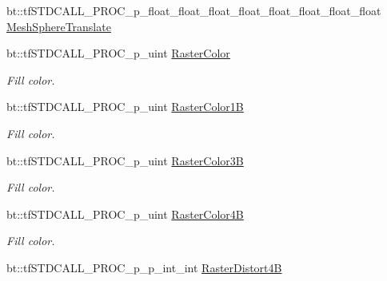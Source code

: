 \begin{DoxyCompactItemize}
\item 
bt\-::tf\-S\-T\-D\-C\-A\-L\-L\-\_\-\-P\-R\-O\-C\-\_\-p\-\_\-float\-\_\-float\-\_\-float\-\_\-float\-\_\-float\-\_\-float\-\_\-float\-\_\-float \hyperlink{structs_functions_gen_a464d544e89a44aaeb9a37f405cb2d516}{Mesh\-Sphere\-Translate}
\item 
\hypertarget{structs_functions_gen_a839cea3a87eb41a580ff3ec9674a6984}{bt\-::tf\-S\-T\-D\-C\-A\-L\-L\-\_\-\-P\-R\-O\-C\-\_\-p\-\_\-uint \hyperlink{structs_functions_gen_a839cea3a87eb41a580ff3ec9674a6984}{Raster\-Color}}\label{structs_functions_gen_a839cea3a87eb41a580ff3ec9674a6984}

\begin{DoxyCompactList}\small\item\em Fill color. \end{DoxyCompactList}\item 
\hypertarget{structs_functions_gen_a5878ffa0b6acbb1fed31276c06c26398}{bt\-::tf\-S\-T\-D\-C\-A\-L\-L\-\_\-\-P\-R\-O\-C\-\_\-p\-\_\-uint \hyperlink{structs_functions_gen_a5878ffa0b6acbb1fed31276c06c26398}{Raster\-Color1\-B}}\label{structs_functions_gen_a5878ffa0b6acbb1fed31276c06c26398}

\begin{DoxyCompactList}\small\item\em Fill color. \end{DoxyCompactList}\item 
\hypertarget{structs_functions_gen_a88464b13e441b87d81396adf4b3a4e31}{bt\-::tf\-S\-T\-D\-C\-A\-L\-L\-\_\-\-P\-R\-O\-C\-\_\-p\-\_\-uint \hyperlink{structs_functions_gen_a88464b13e441b87d81396adf4b3a4e31}{Raster\-Color3\-B}}\label{structs_functions_gen_a88464b13e441b87d81396adf4b3a4e31}

\begin{DoxyCompactList}\small\item\em Fill color. \end{DoxyCompactList}\item 
\hypertarget{structs_functions_gen_af4c91215f954f362ca148762be1191ad}{bt\-::tf\-S\-T\-D\-C\-A\-L\-L\-\_\-\-P\-R\-O\-C\-\_\-p\-\_\-uint \hyperlink{structs_functions_gen_af4c91215f954f362ca148762be1191ad}{Raster\-Color4\-B}}\label{structs_functions_gen_af4c91215f954f362ca148762be1191ad}

\begin{DoxyCompactList}\small\item\em Fill color. \end{DoxyCompactList}\item 
\hypertarget{structs_functions_gen_ae3230acb8b24378d2bbc23419fc0a9b9}{bt\-::tf\-S\-T\-D\-C\-A\-L\-L\-\_\-\-P\-R\-O\-C\-\_\-p\-\_\-p\-\_\-int\-\_\-int \hyperlink{structs_functions_gen_ae3230acb8b24378d2bbc23419fc0a9b9}{Raster\-Distort4\-B}}\label{structs_functions_gen_ae3230acb8b24378d2bbc23419fc0a9b9}


\end{DoxyCompactItemize}
